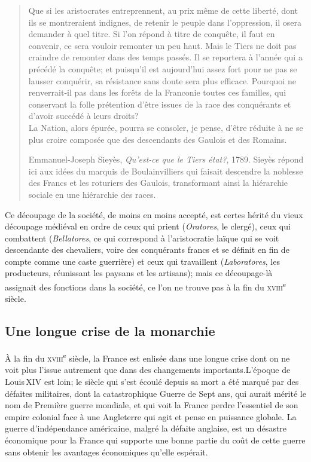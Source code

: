 \documentclass[
  french,
  letterpaper,
  DIV=11,
  numbers=noendperiod]{scrartcl}
\begin{document}
\begin{quote}
Que si les aristocrates entreprennent, au prix même de cette liberté,
dont ils se montreraient indignes, de retenir le peuple dans
l'oppression, il osera demander à quel titre. Si l'on répond à titre de
conquête, il faut en convenir, ce sera vouloir remonter un peu haut.
Mais le Tiers ne doit pas craindre de remonter dans des temps passés. Il
se reportera à l'année qui a précédé la conquête; et puisqu'il est
aujourd'hui assez fort pour ne pas se lausser conquérir, sa résistance
sans doute sera plus efficace. Pourquoi ne renverrait-il pas dans les
forêts de la Franconie toutes ces familles, qui conservant la folle
prétention d'être issues de la race des conquérants et d'avoir succédé à
leurs droits?\\
La Nation, alors épurée, pourra se consoler, je pense, d'être réduite à
ne se plus croire composée que des descendants des Gaulois et des
Romains.

Emmanuel-Joseph Sieyès, \emph{Qu'est-ce que le Tiers état?}, 1789.
Sieyès répond ici aux idées du marquis de Boulainvilliers qui faisait
descendre la noblesse des Francs et les roturiers des Gaulois,
transformant ainsi la hiérarchie sociale en une hiérarchie des races.
\end{quote}

Ce découpage de la société, de moins en moins accepté, est certes hérité
du vieux découpage médiéval en ordre de ceux qui prient
(\emph{Oratores}, le clergé), ceux qui combattent (\emph{Bellatores}, ce
qui correspond à l'aristocratie laïque qui se voit descendante des
chevaliers, voire des conquérants francs et se définit en fin de compte
comme une caste guerrière) et ceux qui travaillent (\emph{Laboratores},
les producteurs, réunissant les paysans et les artisans); mais ce
découpage-là assignait des fonctions dans la société, ce l'on ne trouve
pas à la fin du \textsc{xviii}\textsuperscript{e} siècle.

\subsection{Une longue crise de la
monarchie}\label{une-longue-crise-de-la-monarchie}

À la fin du \textsc{xviii}\textsuperscript{e} siècle, la France est
enlisée dans une longue crise dont on ne voit plus l'issue autrement que
dans des changements importants.L'époque de Louis\,XIV est loin; le
siècle qui s'est écoulé depuis sa mort a été marqué par des défaites
militaires, dont la catastrophique Guerre de Sept ans, qui aurait mérité
le nom de Première guerre mondiale, et qui voit la France perdre
l'essentiel de son empire colonial face à une Angleterre qui agit et
pense en puissance globale. La guerre d'indépendance américaine, malgré
la défaite anglaise, est un désastre économique pour la France qui
supporte une bonne partie du coût de cette guerre sans obtenir les
avantages économiques qu'elle espérait.
\end{document}
